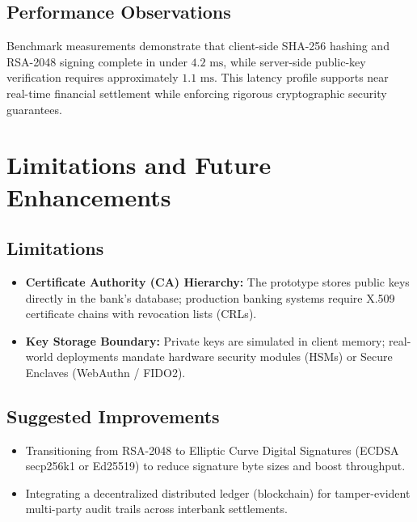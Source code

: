 \documentclass[11pt,a4paper]{article}
\begin{document}
\subsection{Performance Observations}
Benchmark measurements demonstrate that client-side SHA-256 hashing and RSA-2048 signing complete in under $4.2\text{ ms}$, while server-side public-key verification requires approximately $1.1\text{ ms}$. This latency profile supports near real-time financial settlement while enforcing rigorous cryptographic security guarantees.

\section{Limitations and Future Enhancements}

\subsection{Limitations}
\begin{itemize}
    \item \textbf{Certificate Authority (CA) Hierarchy:} The prototype stores public keys directly in the bank's database; production banking systems require X.509 certificate chains with revocation lists (CRLs).
    \item \textbf{Key Storage Boundary:} Private keys are simulated in client memory; real-world deployments mandate hardware security modules (HSMs) or Secure Enclaves (WebAuthn / FIDO2).
\end{itemize}

\subsection{Suggested Improvements}
\begin{itemize}
    \item Transitioning from RSA-2048 to Elliptic Curve Digital Signatures (ECDSA secp256k1 or Ed25519) to reduce signature byte sizes and boost throughput.
    \item Integrating a decentralized distributed ledger (blockchain) for tamper-evident multi-party audit trails across interbank settlements.
\end{itemize}

\end{document}

